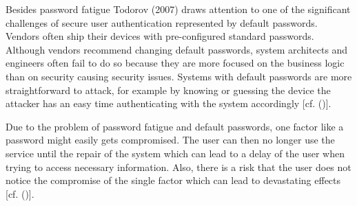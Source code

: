 Besides password fatigue Todorov (2007) draws attention to one of the significant challenges of secure user authentication represented by default passwords. Vendors often ship their devices with pre-configured standard passwords. Although vendors recommend changing default passwords, system architects and engineers often fail to do so because they are more focused on the business logic than on security causing security issues. Systems with default passwords are more straightforward to attack, for example by knowing or guessing the device the attacker has an easy time authenticating with the system accordingly [cf. (\cite{Todorov:2007:MUI})]. 


Due to the problem of password fatigue and default passwords, one factor like a password might easily gets compromised. The user can then no longer use the service until the repair of the system which can lead to a delay of the user when trying to access necessary information. Also, there is a risk that the user does not notice the compromise of the single factor which can lead to devastating effects [cf. (\cite{Dasgupta:2017:AUA})]. 


